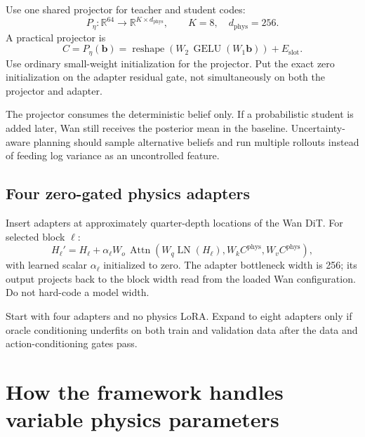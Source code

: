 \documentclass[11pt]{article}
\newcommand{\bvec}{\bm b}
\newcommand{\R}{\mathbb R}
\begin{document}
Use one shared projector for teacher and student codes:
\begin{equation}
  P_\eta:\R^{64}\rightarrow\R^{K\times d_{\mathrm{phys}}},
  \qquad K=8,\quad d_{\mathrm{phys}}=256.
\end{equation}
A practical projector is
\begin{equation}
  C=P_\eta(\bvec)=\operatorname{reshape}
  \left(W_2\,\operatorname{GELU}(W_1\bvec)\right)+E_{\mathrm{slot}}.
  \label{eq:projector-detail}
\end{equation}
Use ordinary small-weight initialization for the projector.  Put the exact
zero initialization on the adapter residual gate, not simultaneously on both
the projector and adapter.

The projector consumes the deterministic belief only.  If a probabilistic
student is added later, Wan still receives the posterior mean in the baseline.
Uncertainty-aware planning should sample alternative beliefs and run multiple
rollouts instead of feeding log variance as an uncontrolled feature.

\subsection{Four zero-gated physics adapters}

Insert adapters at approximately quarter-depth locations of the Wan DiT.  For
selected block $\ell$:
\begin{equation}
  H_\ell'=H_\ell+
  \alpha_\ell W_o\,
  \operatorname{Attn}\!\left(
  W_q\operatorname{LN}(H_\ell),
  W_k C^{\mathrm{phys}},
  W_v C^{\mathrm{phys}}
  \right),
  \label{eq:adapter}
\end{equation}
with learned scalar $\alpha_\ell$ initialized to zero.  The adapter bottleneck
width is 256; its output projects back to the block width read from the loaded
Wan configuration.  Do not hard-code a model width.

Start with four adapters and no physics LoRA.  Expand to eight adapters only if
oracle conditioning underfits on both train and validation data after the data
and action-conditioning gates pass.

\section{How the framework handles variable physics parameters}
\end{document}
